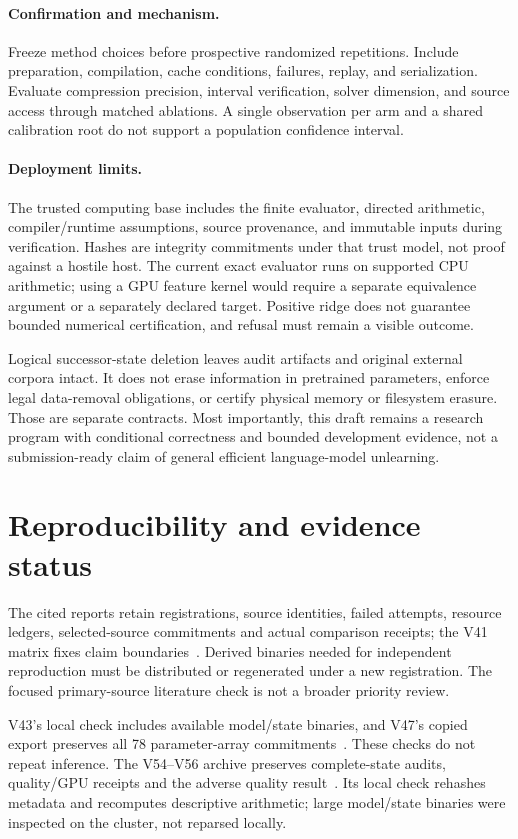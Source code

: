 \documentclass[10pt,twocolumn,letterpaper]{article}
\begin{document}
\paragraph{Confirmation and mechanism.}
Freeze method choices before prospective randomized repetitions. Include
preparation, compilation, cache conditions, failures, replay, and serialization.
Evaluate compression precision, interval verification, solver dimension, and
source access through matched ablations. A single observation per arm and a
shared calibration root do not support a population confidence interval.

\paragraph{Deployment limits.}
The trusted computing base includes the finite evaluator, directed arithmetic,
compiler/runtime assumptions, source provenance, and immutable inputs during
verification. Hashes are integrity commitments under that trust model, not proof
against a hostile host. The current exact evaluator runs on supported CPU
arithmetic; using a GPU feature kernel would require a separate equivalence
argument or a separately declared target. Positive ridge does not guarantee
bounded numerical certification, and refusal must remain a visible outcome.

Logical successor-state deletion leaves audit artifacts and original external
corpora intact. It does not erase information in pretrained parameters, enforce
legal data-removal obligations, or certify physical memory or filesystem erasure.
Those are separate contracts. Most importantly, this draft remains a research
program with conditional correctness and bounded development evidence, not a
submission-ready claim of general efficient language-model unlearning.

\section{Reproducibility and evidence status}
The cited reports retain registrations, source identities, failed attempts,
resource ledgers, selected-source commitments and actual comparison receipts;
the V41 matrix fixes claim boundaries~\cite{v39,v40,boundaries}. Derived binaries
needed for independent reproduction must be distributed or regenerated under a
new registration. The focused primary-source literature check is not a broader
priority review.

V43's local check includes available model/state binaries, and V47's copied
export preserves all 78 parameter-array commitments~\cite{v43,v47}. These checks
do not repeat inference. The V54--V56 archive preserves complete-state audits,
quality/GPU receipts and the adverse quality result~\cite{v58terminal}.
Its local check rehashes metadata and recomputes descriptive arithmetic;
large model/state binaries were inspected on the cluster, not reparsed locally.
\end{document}
